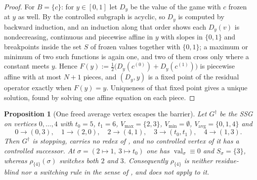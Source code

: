 \documentclass[11pt]{article}
\theoremstyle{plain}
\newtheorem{proposition}[theorem]{Proposition}
\theoremstyle{definition}
\DeclareMathOperator{\val}{val}
\newcommand{\Vmax}{V_{\max}}
\newcommand{\Vmin}{V_{\min}}
\newcommand{\Vavg}{V_{\mathrm{avg}}}
\begin{document}
\begin{proof}
For $B=\{c\}$: for $y\in[0,1]$ let $D_y$ be the value of the game with
$c$ frozen at $y$ as well. By  the controlled
subgraph is acyclic, so $D_y$ is computed by backward induction, and an
induction along that order shows each $D_y(v)$ is nondecreasing,
continuous and piecewise affine in $y$ with slopes in $\{0,1\}$ and
breakpoints inside the set $S$ of frozen values together with $\{0,1\}$;
a maximum or minimum of two such functions is again one, and two of them
cross only where a constant meets $y$. Hence
$F(y):=\frac12\bigl(D_y(c^{(0)})+D_y(c^{(1)})\bigr)$ is piecewise affine
with at most $N+1$ pieces, and $(D_y,y)$ is a fixed point of the residual
operator exactly when $F(y)=y$. Uniqueness of that fixed point gives a
unique solution, found by solving one affine equation on each piece.
\end{proof}

\begin{proposition}[One freed average vertex escapes the
barrier]\label{prop:freeze-escapes}
Let $G^{\dagger}$ be the SSG on vertices $0,\dots,4$ with $t_0=5$,
$t_1=6$, $\Vmax=\{2,3\}$, $\Vmin=\emptyset$, $\Vavg=\{0,1,4\}$ and
\[
  0\to(0,3),\quad 1\to(2,0),\quad 2\to(4,1),\quad 3\to(t_0,t_1),\quad
  4\to(1,3).
\]
Then $G^{\dagger}$ is stopping, carries no redex of ,
and no controlled vertex of it has a controlled successor. At
$\sigma=(2\mapsto1,\ 3\mapsto t_0)$ one has $\val_\sigma\equiv0$ and
$S_\sigma=\{3\}$, whereas $\rho_{\{4\}}(\sigma)$ switches both $2$ and
$3$. Consequently $\rho_{\{4\}}$ is neither residue-blind nor a switching
rule in the sense of , and
 does not apply to it.
\end{proposition}
\end{document}
